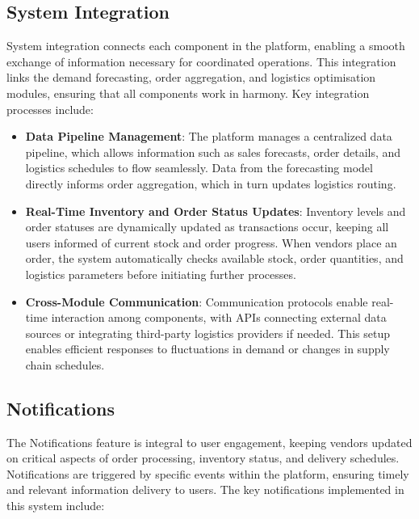 \subsection{System Integration}

System integration connects each component in the platform, enabling a smooth exchange of information necessary for coordinated operations. This integration links the demand forecasting, order aggregation, and logistics optimisation modules, ensuring that all components work in harmony. Key integration processes include:

\begin{itemize}
    \item \textbf{Data Pipeline Management}: The platform manages a centralized data pipeline, which allows information such as sales forecasts, order details, and logistics schedules to flow seamlessly. Data from the forecasting model directly informs order aggregation, which in turn updates logistics routing.
    \item \textbf{Real-Time Inventory and Order Status Updates}: Inventory levels and order statuses are dynamically updated as transactions occur, keeping all users informed of current stock and order progress. When vendors place an order, the system automatically checks available stock, order quantities, and logistics parameters before initiating further processes.
    \item \textbf{Cross-Module Communication}: Communication protocols enable real-time interaction among components, with APIs connecting external data sources or integrating third-party logistics providers if needed. This setup enables efficient responses to fluctuations in demand or changes in supply chain schedules.
\end{itemize}

\subsection{Notifications}

The Notifications feature is integral to user engagement, keeping vendors updated on critical aspects of order processing, inventory status, and delivery schedules. Notifications are triggered by specific events within the platform, ensuring timely and relevant information delivery to users. The key notifications implemented in this system include:

